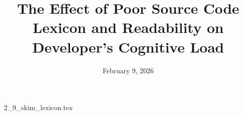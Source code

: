 \documentclass{article}      %
\title{The Effect of Poor Source Code Lexicon and Readability on Developer's Cognitive Load}  %
\date{February 9, 2026}
\begin{document}

\maketitle                   %



{2_9_skim_lexicon.tex}
\printbibliography
\end{document}
